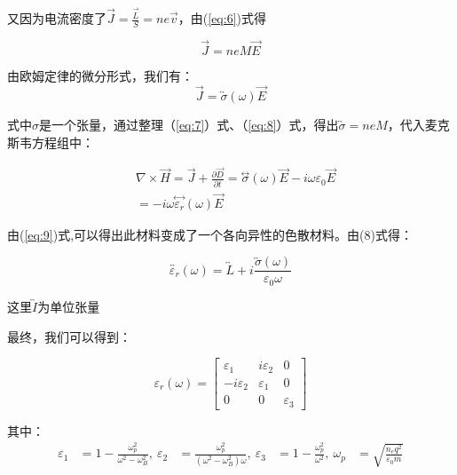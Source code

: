 \documentclass[12pt]{ctexart}
\numberwithin{equation}{section} %
\begin{document}
又因为电流密度了$\overrightarrow{J}=\frac{\vec{L}}{S}=ne\overrightarrow{v}$，由(\ref{eq:6})式得

\begin{equation}
\overrightarrow{J}=neM\overrightarrow{E}
\label{eq:7}
\end{equation}

由欧姆定律的微分形式，我们有：
\begin{equation}
\overrightarrow{J}=\overleftrightarrow{{\sigma}}(\omega)\overrightarrow{E} 
\label{eq:8}
\end{equation}
\par 式中$\sigma$是一个张量，通过整理（\ref{eq:7}）式、（\ref{eq:8}）式，得出$\overleftrightarrow{\sigma}=neM$，代入麦克斯韦方程组中：

\begin{equation}
\begin{aligned}
&\nabla\times\overrightarrow{H} = \overrightarrow{J}+\frac{\partial\overrightarrow{D}}{\partial t} = \stackrel{\leftrightarrow}{{\sigma}}(\omega)\overrightarrow{E}-i\omega\varepsilon_{0}\overrightarrow{E}\\
& =-i\omega\stackrel{\leftrightarrow}{{\varepsilon}_{r}}(\omega)\overrightarrow{E} 
\label{eq:9}
\end{aligned}
\end{equation}

由(\ref{eq:9})式,可以得出此材料变\cite{艾延宝2002法拉第磁致旋光效应及应用}成了一个各向异性的色散材料。由(8)式得：

\begin{equation}
    \overleftrightarrow{{\varepsilon}_{r}}(\omega) =\overleftrightarrow{L}+i\frac{\overleftrightarrow{{\sigma}}(\omega)}{\varepsilon_{0}\omega} \label{ eq:10}
\end{equation}
\par 这里$\overleftrightarrow{I}$为单位张量

最终，我们可以得到：

\begin{equation}
    \varepsilon_{r}(\omega) = \begin{bmatrix} \varepsilon_{1} & i\varepsilon_{2} & 0 \\ -i\varepsilon_{2} & \varepsilon_{1} & 0 \\ 0 & 0 & \varepsilon_{3} \end{bmatrix} 
\label{eq:11}
\end{equation}

其中：
\begin{equation*}
    \begin{aligned}
    \varepsilon_{1} &= 1-\frac{\omega_{p}^{2}}{\omega^{2}-\omega_{B}^{2}},\
    \varepsilon_{2} &= \frac{\omega_{p}^{2}}{(\omega^{2}-\omega_{B}^{2})\omega},\
    \varepsilon_{3} &= 1-\frac{\omega_{p}^{2}}{\omega^{2}},\
    \omega_{p} &= \sqrt{\frac{n_{e}q^{2}}{\varepsilon_{0}m}}
    \end{aligned}
\end{equation*}
\end{document}
